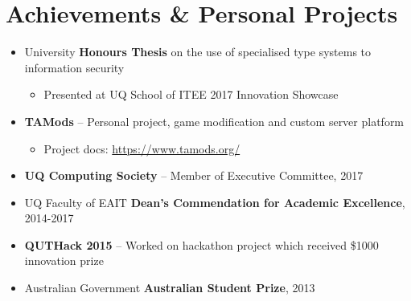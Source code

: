 \documentclass[11pt,a4paper,sans]{moderncv}        %
\begin{document}
\section{Achievements \& Personal Projects}
\begin{minipage}{\maincolumnwidth}\small
	\begin{itemize}
		\item University \textbf{Honours Thesis} on the use of specialised type systems to information security
		\begin{itemize}
			\item Presented at UQ School of ITEE 2017 Innovation Showcase
		\end{itemize}
		\item \textbf{TAMods} -- Personal project, game modification and custom server platform
		\begin{itemize}
			\item Project docs: \href{https://www.tamods.org/}{https://www.tamods.org/}
		\end{itemize}
		\item \textbf{UQ Computing Society} -- Member of Executive Committee, 2017
		\item UQ Faculty of EAIT \textbf{Dean's Commendation for Academic Excellence}, 2014-2017
		\item \textbf{QUTHack 2015} -- Worked on hackathon project which received \$1000 innovation prize
		\item Australian Government \textbf{Australian Student Prize}, 2013
	\end{itemize}
\end{minipage}

\end{document}
